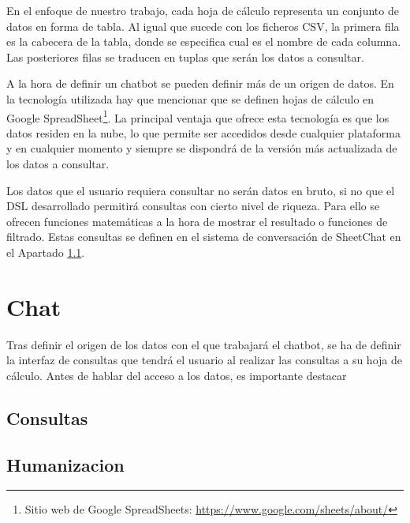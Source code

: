 En el enfoque de nuestro trabajo, cada hoja de cálculo representa un conjunto de datos en forma de tabla. Al igual que sucede con los ficheros CSV, la primera fila es la cabecera de la tabla, donde se especifica cual es el nombre de cada columna. Las posteriores filas se traducen en tuplas que serán los datos a consultar.

A la hora de definir un chatbot se pueden definir más de un origen de datos. En la tecnología utilizada hay que mencionar que se definen hojas de cálculo en Google SpreadSheet\footnote{Sitio web de Google SpreadSheets: \url{https://www.google.com/sheets/about/}}. La principal ventaja que ofrece esta tecnología es que los datos residen en la nube, lo que permite ser accedidos desde cualquier plataforma y en cualquier momento y siempre se dispondrá de la versión más actualizada de los datos a consultar.


Los datos que el usuario requiera consultar no serán datos en bruto, si no que el DSL desarrollado permitirá consultas con cierto nivel de riqueza. Para ello se ofrecen funciones matemáticas a la hora de mostrar el resultado o funciones de filtrado. Estas consultas se definen en el sistema de conversación de SheetChat en el Apartado \ref{sec:Consultas}.

\section{Chat}
\label{sec:Chat}

Tras definir el origen de los datos con el que trabajará el chatbot, se ha de definir la interfaz de consultas que tendrá el usuario al realizar las consultas a su hoja de cálculo. Antes de hablar del acceso a los datos, es importante destacar 


\subsection{Consultas}
\label{sec:Consultas}






\subsection{Humanizacion}
\label{sec:Humanization}





